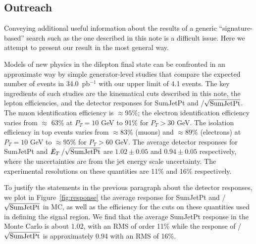 \subsection{Outreach}
\label{sec:outreach}
Conveying additional useful information about the results of
a generic ``signature-based'' search such as the one described
in this note is a difficult issue.  
Here we attempt to present our result in the most general 
way.

Models of new physics in the dilepton final state 
can be confronted in an approximate way by simple 
generator-level studies that 
compare the expected number of events in 34.0~pb$^{-1}$
with our upper limit of 4.1 events.  The key ingredients
of such studies are the kinematical cuts described 
in this note, the lepton efficiencies, and the detector
responses for SumJetPt and \met/$\sqrt{\rm SumJetPt}$.
The muon identification efficiency is $\approx 95\%$;
the electron identification efficiency varies from $\approx$ 63\% at 
$P_T = 10$ GeV to 91\% for $P_T > 30$ GeV.  The isolation
efficiency in top events varies from $\approx 83\%$ (muons)
and $\approx 89\%$ (electrons) at $P_T=10$ GeV to 
$\approx 95\%$ for $P_T>60$ GeV. 
The average detector 
responses for SumJetPt and $\met/\sqrt{\rm SumJetPt}$ are 
$1.02 \pm 0.05$ and $0.94 \pm 0.05$ respectively, where
the uncertainties are from the jet energy scale uncertainty.
The experimental resolutions on these quantities are 11\% and 
16\% respectively.

To justify the statements in the previous paragraph 
about the detector responses, we plot 
in Figure~\ref{fig:response} the average response for 
SumJetPt and \met/$\sqrt{\rm SumJetPt}$ in MC, as well as the
efficiency for the cuts on these quantities used in defining the
signal region.
We find that the average SumJetPt response 
in the Monte Carlo is about 1.02, with an RMS of order 11\% while
the response of \met/$\sqrt{\rm SumJetPt}$ is approximately 0.94 with an
RMS of 16\%.


